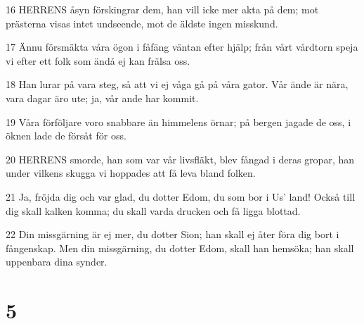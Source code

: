 \par 16 HERRENS åsyn förskingrar dem, han vill icke mer akta på dem; mot prästerna visas intet undseende, mot de äldste ingen misskund.
\par 17 Ännu försmäkta våra ögon i fåfäng väntan efter hjälp; från vårt vårdtorn speja vi efter ett folk som ändå ej kan frälsa oss.
\par 18 Han lurar på vara steg, så att vi ej våga gå på våra gator. Vår ände är nära, vara dagar äro ute; ja, vår ande har kommit.
\par 19 Våra förföljare voro snabbare än himmelens örnar; på bergen jagade de oss, i öknen lade de försåt för oss.
\par 20 HERRENS smorde, han som var vår livsfläkt, blev fångad i deras gropar, han under vilkens skugga vi hoppades att få leva bland folken.
\par 21 Ja, fröjda dig och var glad, du dotter Edom, du som bor i Us' land! Också till dig skall kalken komma; du skall varda drucken och få ligga blottad.
\par 22 Din missgärning är ej mer, du dotter Sion; han skall ej åter föra dig bort i fångenskap. Men din missgärning, du dotter Edom, skall han hemsöka; han skall uppenbara dina synder.

\chapter{5}

